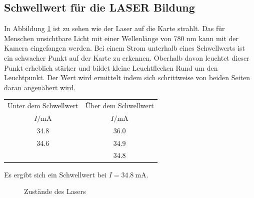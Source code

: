 \subsection{Schwellwert für die LASER Bildung}
In Abbildung \ref{fig:laser_karte} ist zu sehen wie der Laser auf die Karte strahlt.
Das für Menschen unsichtbare Licht mit einer Wellenlänge von 780 nm kann mit der Kamera eingefangen werden. %
Bei einem Strom unterhalb eines Schwellwerts ist ein schwacher Punkt auf der Karte zu erkennen.
Oberhalb davon leuchtet dieser Punkt erheblich stärker und bildet kleine Leuchtflecken Rund um den Leuchtpunkt.
Der Wert wird ermittelt indem sich schrittweise von beiden Seiten daran angenähert wird.
\begin{tabular}[table-format=2.1]{S S}
    \toprule
    {Unter dem Schwellwert} & {Über dem Schwellwert} \\
    {$I/\si{\milli\ampere}$} & {$I/\si{\milli\ampere}$}\\
      & 36.0 \\
    34.6  & 34.9 \\
          & 34.8 \\
    \bottomrule    
\end{tabular}
Es ergibt sich ein Schwellwert bei $I = \qty{34.8}{\milli\ampere}$.

\begin{figure}
    \centering
    \hfill
    \caption{Zustände des Lasers}\label{fig:laser_karte}
\end{figure}

